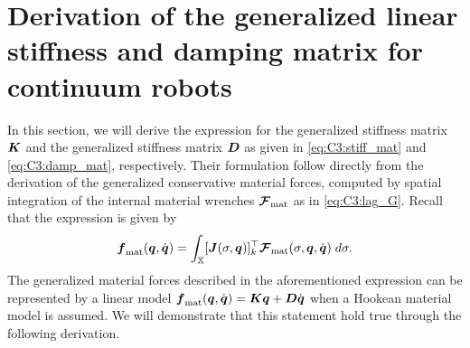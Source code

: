 \section{Derivation of the generalized linear stiffness and damping matrix for continuum robots}
\label{app:C3:linearmaterialmatrices}
In this section, we will derive the expression for the generalized stiffness matrix ${\boldsymbol{K}}$ and the generalized stiffness matrix ${\boldsymbol{D}}$ as given in \eqref{eq:C3:stiff_mat} and \eqref{eq:C3:damp_mat}, respectively. Their formulation follow directly from the derivation of the generalized conservative material forces, computed by spatial integration of the internal material wrenches $\boldsymbol{\mathcal{F}}_{\textrm{mat}}$ as in \eqref{eq:C3:lag_G}. Recall that the expression is given by
%
\begin{equation}
{\boldsymbol{f}}_{\textrm{mat}}({\boldsymbol{q}},{\dot{\boldsymbol{q}}}) = \int_{\mathbb{X}} [{\boldsymbol{J}}(\sigma,{\boldsymbol{q}})]_k^\top {\boldsymbol{\mathcal{F}}}_\textrm{mat}(\sigma,{\boldsymbol{q}},{\dot{\boldsymbol{q}}}) \; d\sigma. \label{eq:app_gen_materialforces}
\end{equation}
%
The generalized material forces described in the aforementioned expression can be represented by a linear model ${\boldsymbol{f}}_{\textrm{mat}}({\boldsymbol{q}},{\dot{\boldsymbol{q}}}) = {\boldsymbol{K}} {\boldsymbol{q}} + {\boldsymbol{D}} {\dot{\boldsymbol{q}}}$ when a Hookean material model is assumed. We will demonstrate that this statement hold true through the following derivation.

